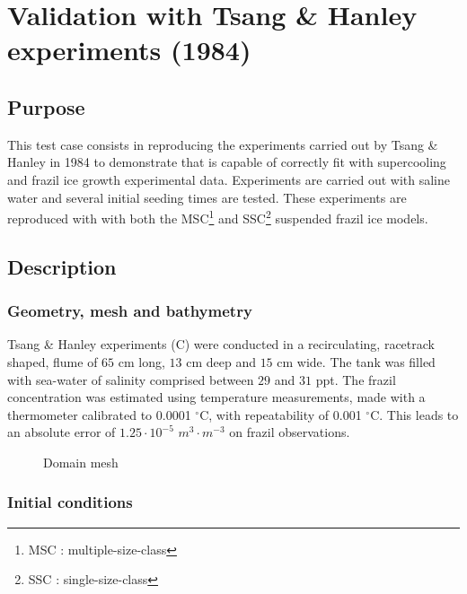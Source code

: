\renewcommand{\labelitemi}{$\triangleright$}

\chapter{Validation with Tsang \& Hanley experiments (1984)}

\section{Purpose}

This test case consists in reproducing the experiments carried out by Tsang \& Hanley in 1984 \citep{Tsang_1984} 
to demonstrate that \khione is capable of correctly fit with supercooling and frazil ice growth experimental data.
Experiments are carried out with saline water and several initial seeding times are tested.
These experiments are reproduced with \khione with both the MSC\footnote{MSC : multiple-size-class} and SSC\footnote{SSC : single-size-class} suspended frazil ice models.

\section{Description}

\subsection{Geometry, mesh and bathymetry}

Tsang \& Hanley experiments \cite{Tsang_1984} (C) were conducted in a recirculating, racetrack shaped, 
flume of $65$ cm long, $13$ cm deep and $15$ cm wide.
The tank was filled with sea-water of salinity comprised between $29$ and $31$ ppt.
The frazil concentration was estimated using temperature measurements,
made with a thermometer calibrated to 0.0001 $^\circ $C, with repeatability of 0.001 $^\circ$C. 
This leads to an absolute error of $ 1.25 \cdot 10^{-5}$ $m^3\cdot m^{-3}$ on frazil observations.

\begin{figure}[H]
    \begin{center}
    \end{center}
    \caption{Domain mesh}
    \label{fig:growth_mesh}
\end{figure}

\subsection{Initial conditions}

